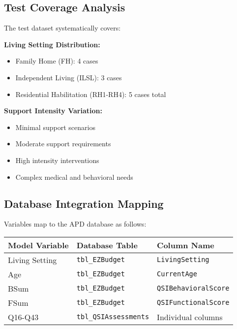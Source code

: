 \subsection{Test Coverage Analysis}

The test dataset systematically covers:

\textbf{Living Setting Distribution:}
\begin{itemize}
    \item Family Home (FH): 4 cases
    \item Independent Living (ILSL): 3 cases
    \item Residential Habilitation (RH1-RH4): 5 cases total
\end{itemize}

\textbf{Support Intensity Variation:}
\begin{itemize}
    \item Minimal support scenarios
    \item Moderate support requirements
    \item High intensity interventions
    \item Complex medical and behavioral needs
\end{itemize}

\subsection{Database Integration Mapping}

Variables map to the APD database as follows:

\begin{center}
\begin{tabular}{|l|l|l|}
\hline
\textbf{Model Variable} & \textbf{Database Table} & \textbf{Column Name} \\
\hline
Living Setting & \texttt{tbl\_EZBudget} & \texttt{LivingSetting} \\
Age & \texttt{tbl\_EZBudget} & \texttt{CurrentAge} \\
BSum & \texttt{tbl\_EZBudget} & \texttt{QSIBehavioralScore} \\
FSum & \texttt{tbl\_EZBudget} & \texttt{QSIFunctionalScore} \\
Q16-Q43 & \texttt{tbl\_QSIAssessments} & Individual columns \\
\hline
\end{tabular}
\end{center}

